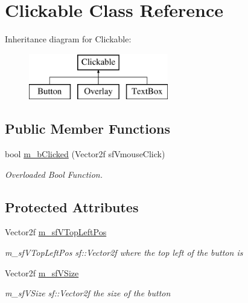 \hypertarget{class_clickable}{}\section{Clickable Class Reference}
\label{class_clickable}
Inheritance diagram for Clickable\+:\begin{figure}[H]
\begin{center}
\leavevmode
\includegraphics[height=2.000000cm]{class_clickable}
\end{center}
\end{figure}
\subsection*{Public Member Functions}
\begin{DoxyCompactItemize}
\item 
bool \hyperlink{class_clickable_a18e5ca51c572c9cb8a64dced28ccec09}{m\+\_\+b\+Clicked} (Vector2f sf\+Vmouse\+Click)
\begin{DoxyCompactList}\small\item\em Overloaded Bool Function. \end{DoxyCompactList}\end{DoxyCompactItemize}
\subsection*{Protected Attributes}
\begin{DoxyCompactItemize}
\item 
\hypertarget{class_clickable_a220f75f818fc4f3b973c1531044816be}{}\label{class_clickable_a220f75f818fc4f3b973c1531044816be} 
Vector2f \hyperlink{class_clickable_a220f75f818fc4f3b973c1531044816be}{m\+\_\+sf\+V\+Top\+Left\+Pos}
\begin{DoxyCompactList}\small\item\em m\+\_\+sf\+V\+Top\+Left\+Pos sf\+::\+Vector2f where the top left of the button is \end{DoxyCompactList}\item 
\hypertarget{class_clickable_a49ad5930a2e78bd3adfb414115005351}{}\label{class_clickable_a49ad5930a2e78bd3adfb414115005351} 
Vector2f \hyperlink{class_clickable_a49ad5930a2e78bd3adfb414115005351}{m\+\_\+sf\+V\+Size}
\begin{DoxyCompactList}\small\item\em m\+\_\+sf\+V\+Size sf\+::\+Vector2f the size of the button \end{DoxyCompactList}\end{DoxyCompactItemize}


